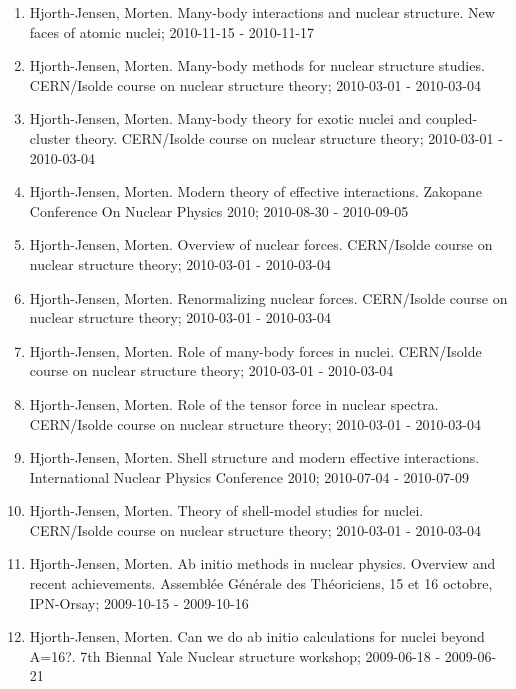 \documentclass[%
oneside,                 %
final,                   %
10pt]{article}
\begin{document}
\begin{enumerate}
\item Hjorth-Jensen, Morten.  Many-body interactions and nuclear structure. New faces of atomic nuclei; 2010-11-15 - 2010-11-17

\item Hjorth-Jensen, Morten.  Many-body methods for nuclear structure studies. CERN/Isolde course on nuclear structure theory; 2010-03-01 - 2010-03-04

\item Hjorth-Jensen, Morten.  Many-body theory for exotic nuclei and coupled-cluster theory. CERN/Isolde course on nuclear structure theory; 2010-03-01 - 2010-03-04

\item Hjorth-Jensen, Morten.  Modern theory of effective interactions. Zakopane Conference On Nuclear Physics 2010; 2010-08-30 - 2010-09-05

\item Hjorth-Jensen, Morten.  Overview of nuclear forces. CERN/Isolde course on nuclear structure theory; 2010-03-01 - 2010-03-04

\item Hjorth-Jensen, Morten.  Renormalizing nuclear forces. CERN/Isolde course on nuclear structure theory; 2010-03-01 - 2010-03-04

\item Hjorth-Jensen, Morten.  Role of many-body forces in nuclei. CERN/Isolde course on nuclear structure theory; 2010-03-01 - 2010-03-04

\item Hjorth-Jensen, Morten.  Role of the tensor force in nuclear spectra. CERN/Isolde course on nuclear structure theory; 2010-03-01 - 2010-03-04

\item Hjorth-Jensen, Morten.  Shell structure and modern effective interactions. International Nuclear Physics Conference 2010; 2010-07-04 - 2010-07-09

\item Hjorth-Jensen, Morten.  Theory of shell-model studies for nuclei. CERN/Isolde course on nuclear structure theory; 2010-03-01 - 2010-03-04

\item Hjorth-Jensen, Morten.  Ab initio methods in nuclear physics. Overview and recent achievements. Assemblée Générale des Théoriciens, 15 et 16 octobre, IPN-Orsay; 2009-10-15 - 2009-10-16

\item Hjorth-Jensen, Morten.  Can we do ab initio calculations for nuclei beyond A=16?. 7th Biennal Yale Nuclear structure workshop; 2009-06-18 - 2009-06-21


\end{enumerate}
\end{document}
